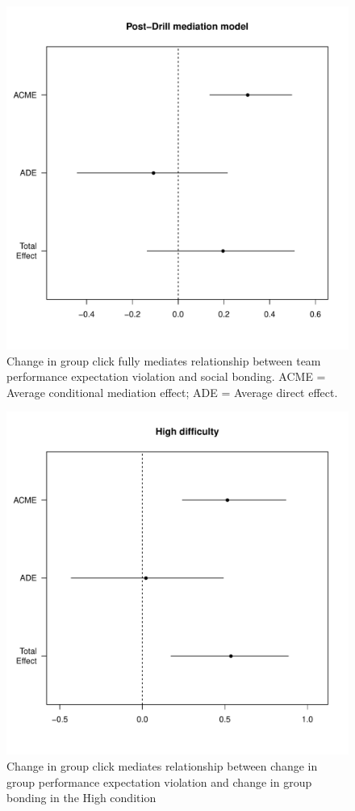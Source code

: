 \begin{figure}
  \centering
  \includegraphics[width=0.5\linewidth,keepaspectratio] {images/groupPerfExpClickMediationPlot}
  \caption{Change in group click fully mediates relationship between team performance expectation violation and social bonding. ACME = Average conditional mediation effect; ADE = Average direct effect.}
  \label{fig:groupPerfExpClickChangeMedPlot}
\end{figure}


\begin{figure}
  \centering
  \includegraphics[width=0.5\linewidth,keepaspectratio] {images/groupPerfExpClickMediationPlotHigh}
  \caption{Change in group click mediates relationship between change in group performance expectation violation and change in group bonding in the High condition}
  \label{fig:groupPerfClickChangeMedPlotHigh}
\end{figure}

